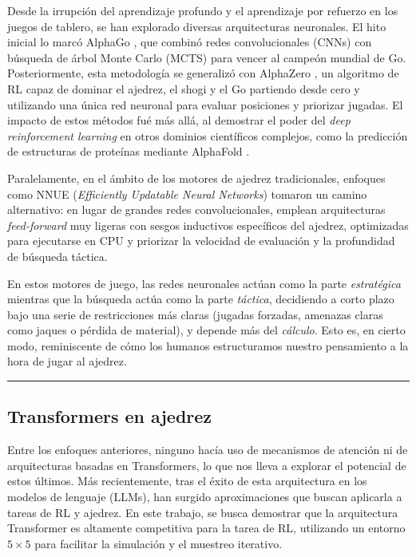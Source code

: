 \documentclass[12pt, a4paper]{article}
\let\cite\supercite
\begin{document}
Desde la irrupción del aprendizaje profundo y el aprendizaje por refuerzo en los juegos de tablero, se han explorado diversas arquitecturas neuronales. El hito inicial lo marcó AlphaGo \cite{silver2016mastering}, que combinó redes convolucionales (CNNs) con búsqueda de árbol Monte Carlo (MCTS) para vencer al campeón mundial de Go. Posteriormente, esta metodología se generalizó con AlphaZero \cite{silver2018general}, un algoritmo de RL capaz de dominar el ajedrez, el shogi y el Go partiendo desde cero y utilizando una única red neuronal para evaluar posiciones y priorizar jugadas. El impacto de estos métodos fué más allá, al demostrar el poder del \textit{deep reinforcement learning} en otros dominios científicos complejos, como la predicción de estructuras de proteínas mediante AlphaFold \cite{jumper2021highly}.

Paralelamente, en el ámbito de los motores de ajedrez tradicionales, enfoques como NNUE (\textit{Efficiently Updatable Neural Networks}) \cite{nasu2018efficiently} tomaron un camino alternativo: en lugar de grandes redes convolucionales, emplean arquitecturas \textit{feed-forward} muy ligeras con sesgos inductivos específicos del ajedrez, optimizadas para ejecutarse en CPU y priorizar la velocidad de evaluación y la profundidad de búsqueda táctica. 

En estos motores de juego, las redes neuronales actúan como la parte \textit{estratégica} mientras que la búsqueda actúa como la parte \textit{táctica}, decidiendo a corto plazo bajo una serie de restricciones más claras (jugadas forzadas, amenazas claras como jaques o pérdida de material), y depende más del \textit{cálculo}. Esto es, en cierto modo, reminiscente de cómo los humanos estructuramos nuestro pensamiento a la hora de jugar al ajedrez.

\rule{\textwidth}{0.2pt}
\subsection{Transformers en ajedrez}

Entre los enfoques anteriores, ninguno hacía uso de mecanismos de atención ni de arquitecturas basadas en Transformers, lo que nos lleva a explorar el potencial de estos últimos.
Más recientemente, tras el éxito de esta arquitectura en los modelos de lenguaje (LLMs), han surgido aproximaciones que buscan aplicarla a tareas de RL y ajedrez. En este trabajo, se busca demostrar que la arquitectura Transformer es altamente competitiva para la tarea de RL, utilizando un entorno $5\times5$ para facilitar la simulación y el muestreo iterativo.
\end{document}
